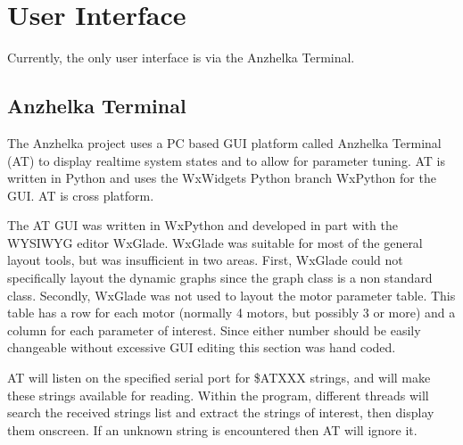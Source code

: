 \documentclass{article}
\numberwithin{equation}{section} %
\begin{document}





 
\section{User Interface}
Currently, the only user interface is via the Anzhelka Terminal.
\subsection{Anzhelka Terminal}
The Anzhelka project uses a PC based GUI platform called Anzhelka Terminal (AT) to display realtime system states and to allow for parameter tuning. AT is written in Python and uses the WxWidgets Python branch WxPython for the GUI. AT is cross platform.

The AT GUI was written in WxPython and developed in part with the WYSIWYG editor WxGlade. WxGlade was suitable for most of the general layout tools, but was insufficient in two areas. First, WxGlade could not specifically layout the dynamic graphs since the graph class is a non standard class. Secondly, WxGlade was not used to layout the motor parameter table. This table has a row for each motor (normally 4 motors, but possibly 3 or more) and a column for each parameter of interest. Since either number should be easily changeable without excessive GUI editing this section was hand coded.

AT will listen on the specified serial port for \$ATXXX strings, and will  make these strings available for reading. Within the program, different threads will search the received strings list and extract the strings of interest, then display them onscreen. If an unknown string is encountered then AT will ignore it.
\end{document}
